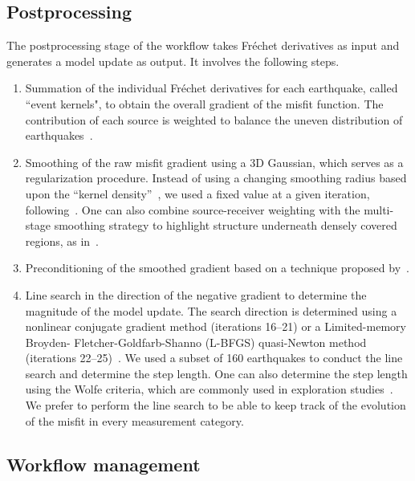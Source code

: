 \documentclass[extra,mreferee]{gji}
\begin{document}
\subsection{Postprocessing}

The postprocessing stage of the workflow takes Fr\'echet derivatives as input and
generates a model update as output.
It involves the following steps.
\begin{enumerate}
  \item Summation of the individual Fr\'echet derivatives for each earthquake, called ``event kernels", to obtain the overall gradient of the misfit function. The contribution of each source is weighted to balance
    the uneven distribution of earthquakes~\citep{Ruanetal2018}.
  \item Smoothing of the raw misfit gradient using a 3D Gaussian, which
    serves as a regularization procedure. Instead of using a changing
    smoothing radius based upon the ``kernel density''~\citep{bozdaug2016global},
    we used a fixed value at a given iteration, following~\cite{zhu2012structure}. One can also combine source-receiver weighting with the multi-stage smoothing strategy to highlight structure underneath densely covered regions, as in~\citet{bozdaug2016global}.
  \item Preconditioning of the smoothed gradient based on a technique proposed by~\cite{luo2013strategies}.
  \item Line search in the direction of the negative gradient to determine the magnitude of the model update.
  The search direction is determined using a nonlinear conjugate gradient method (iterations 16--21) or a Limited-memory Broyden- Fletcher-Goldfarb-Shanno (L-BFGS) quasi-Newton method (iterations 22--25)~\citep{wright1999numerical,NoWr06}.
  We used a subset of 160 earthquakes to conduct the line search and determine the step length.
  One can also determine the step length using the Wolfe criteria, which are commonly used in exploration studies~\citep{NoWr06}. We prefer to perform the line search to be able to keep track of the evolution of the misfit in every measurement category.
\end{enumerate}

\subsection{Workflow management}
\end{document}
